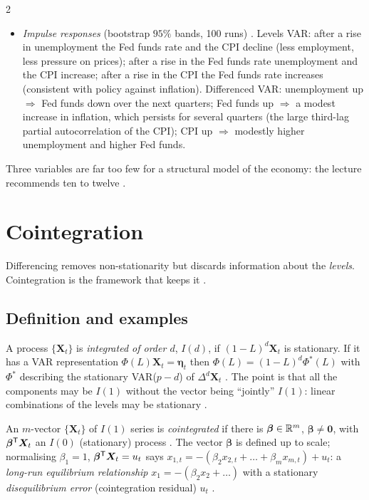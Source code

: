 \begin{paracol}{2}
\begin{casestudy}
\begin{itemize}
  \item \emph{Impulse responses} (bootstrap $95\%$ bands, 100 runs) . Levels VAR: after a rise in unemployment the Fed funds rate
        and the CPI decline (less employment, less pressure on prices); after a rise in the Fed funds rate unemployment and the CPI increase; after a
        rise in the CPI the Fed funds rate increases (consistent with policy against inflation). Differenced VAR: unemployment up $\Rightarrow$ Fed funds
        down over the next quarters; Fed funds up $\Rightarrow$ a modest increase in inflation, which persists for several quarters (the large third-lag
        partial autocorrelation of the CPI); CPI up $\Rightarrow$ modestly higher unemployment and higher Fed funds.
\end{itemize}
Three variables are far too few for a structural model of the economy: the lecture recommends ten to twelve
.
\end{casestudy}

\section{Cointegration}\label{ch09:sec-coint}

Differencing removes non-stationarity but discards information about the \emph{levels}. Cointegration is the framework that keeps it
.

\subsection{Definition and examples}
A process $\{\bm X_t\}$ is \emph{integrated of order $d$}, $I(d)$, if $(1-L)^d\bm X_t$ is stationary. If it has a VAR representation
$\Phi(L)\bm X_t=\bm\eta_t$ then $\Phi(L)=(1-L)^d\Phi^*(L)$ with $\Phi^*$ describing the stationary VAR($p-d$) of $\Delta^d\bm X_t$
. The point is that all the components may be $I(1)$ without the vector being ``jointly'' $I(1)$: linear
combinations of the levels may be stationary .

\begin{definition}[Cointegration]\label{ch09:def-coint}
An $m$-vector $\{\bm X_t\}$ of $I(1)$ series is \emph{cointegrated} if there is $\bm\beta\in\mathbb{R}^m$, $\bm\beta\ne\bm0$, with $\bm\beta^{\mathsf T}\bm X_t$ an $I(0)$ (stationary)
process . The vector $\bm\beta$ is defined up to scale; normalising $\beta_1=1$,
$\bm\beta^{\mathsf T}\bm X_t=u_t$ says $x_{1,t}=-(\beta_2x_{2,t}+\dots+\beta_mx_{m,t})+u_t$: a \emph{long-run equilibrium relationship}
$x_1=-(\beta_2x_2+\dots)$ with a stationary \emph{disequilibrium error} (cointegration residual) $u_t$ .
\end{definition}


\end{paracol}
